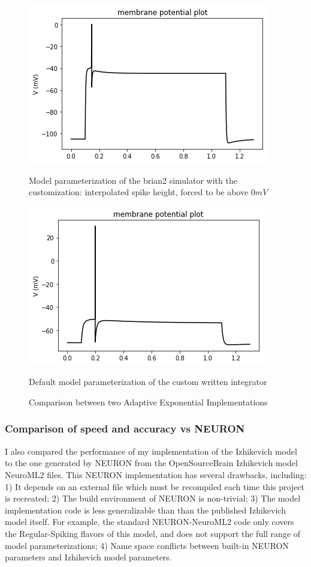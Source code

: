 \begin{figure}
\begin{center}
\centering
  \centering
\includegraphics[scale=0.45]{figures/backend_check_files/backend_check_12_10}
\caption{Model parameterization of the brian2 simulator with the customization: interpolated spike height, forced to be above $0mV$}

  \label{fig:sub1}
  \centering
  \includegraphics[scale=0.45]{figures/backend_check_files/backend_check_4_2}
    \caption{Default model parameterization of the custom written integrator}
  \label{fig:sub2}
\caption{Comparison between two Adaptive Exponential Implementations}
\label{fig:test}
\end{center}
\end{figure}


\subsubsection{Comparison of speed and accuracy vs NEURON}
I also compared the performance of my implementation of the Izhikevich model to the one generated by NEURON from the OpenSourceBrain Izhikevich model NeuroML2 files.
This NEURON implementation has several drawbacks, including: 1) It depends on an external file which must be recompiled each time this project is recreated; 2) The build environment of NEURON is non-trivial; 3) The model implementation code is less generalizable than than the published Izhikevich model itself. For example, the standard NEURON-NeuroML2 code only covers the Regular-Spiking flavors of this model, and does not support the full range of model parameterizations; 4) Name space conflicts between built-in NEURON parameters and Izhikevich model parameters.  

